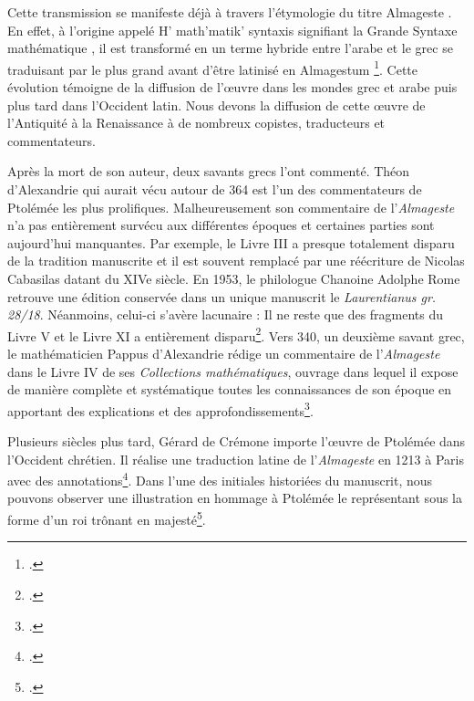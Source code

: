 Cette transmission se manifeste déjà à travers l'étymologie du titre \og Almageste \fg.
En effet, à l'origine appelé \og H' math'matik' syntaxis \fg signifiant la \og Grande Syntaxe mathématique \fg,
il est transformé en un terme hybride entre l'arabe et le grec se traduisant par \og le plus grand \fg avant d'être latinisé en \og Almagestum \fg\footcite{raymondjonesPtolemyAccomplishmentsBiography2025}.
Cette évolution témoigne de la diffusion de l'œuvre dans les mondes grec et arabe puis plus tard dans l'Occident latin.
Nous devons la diffusion de cette œuvre de l'Antiquité à la Renaissance à de nombreux copistes, traducteurs et commentateurs.

Après la mort de son auteur, deux savants grecs l'ont commenté. Théon d'Alexandrie qui aurait vécu autour de 364 est l'un des commentateurs de Ptolémée les plus prolifiques.
Malheureusement son commentaire de l'\textit{Almageste} n'a pas entièrement survécu aux différentes époques et certaines parties sont aujourd'hui manquantes.
Par exemple, le Livre III a presque totalement disparu de la tradition manuscrite et il est souvent remplacé par une réécriture de Nicolas Cabasilas datant du XIVe siècle.
En 1953, le philologue Chanoine Adolphe Rome retrouve une édition conservée dans un unique manuscrit le \textit{Laurentianus gr. 28/18}.
Néanmoins, celui-ci s'avère lacunaire : Il ne reste que des fragments du Livre V et le Livre XI a entièrement disparu\footcite{tihonLivreRetrouveCommentaire1987}.
Vers 340, un deuxième savant grec, le mathématicien Pappus d'Alexandrie rédige un commentaire de l'\textit{Almageste} dans le Livre IV de ses \textit{Collections mathématiques},
ouvrage dans lequel il expose de manière complète et systématique toutes les connaissances de son époque en apportant des explications et des approfondissements\footcite{meyerPAPPUS1999}.

Plusieurs siècles plus tard, Gérard de Crémone importe l'œuvre de Ptolémée dans l'Occident chrétien. 
Il réalise une traduction latine de l'\textit{Almageste} en 1213 à Paris avec des annotations\footcite{ptolemaeusPtolomeusAlmagestumTransl1213}. 
Dans l'une des initiales historiées du manuscrit, nous pouvons observer une illustration en hommage à Ptolémée le représentant sous la forme d'un roi trônant en majesté\footcite{TraductionLatineLAlmageste}.

